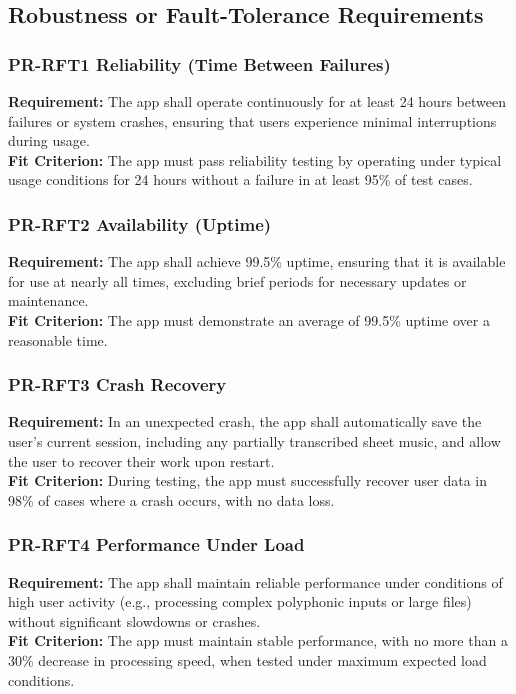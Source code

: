 \documentclass[12pt]{article}
\begin{document}
\subsection{Robustness or Fault-Tolerance Requirements}
\subsubsection*{PR-RFT1 Reliability (Time Between Failures)} \label{PR-RFT1}
\textbf{Requirement:} The app shall operate continuously for at least 24 hours between failures or system crashes, ensuring that users experience minimal interruptions during usage.\\
\textbf{Fit Criterion:} The app must pass reliability testing by operating under typical usage conditions for 24 hours without a failure in at least 95\% of test cases.
\subsubsection*{PR-RFT2 Availability (Uptime)} \label{PR-RFT2}
\textbf{Requirement:} The app shall achieve 99.5\% uptime, ensuring that it is available for use at nearly all times, excluding brief periods for necessary updates or maintenance.\\
\textbf{Fit Criterion:} The app must demonstrate an average of 99.5\% uptime over a reasonable time.
\subsubsection*{PR-RFT3 Crash Recovery} \label{PR-RFT3}
\textbf{Requirement:} In an unexpected crash, the app shall automatically save the user’s current session, including any partially transcribed sheet music, and allow the user to recover their work upon restart.\\
\textbf{Fit Criterion:} During testing, the app must successfully recover user data in 98\% of cases where a crash occurs, with no data loss.
\subsubsection*{PR-RFT4 Performance Under Load} \label{PR-RFT4}
\textbf{Requirement:} The app shall maintain reliable performance under conditions of high user activity (e.g., processing complex polyphonic inputs or large files) without significant slowdowns or crashes.\\
\textbf{Fit Criterion:} The app must maintain stable performance, with no more than a 30\% decrease in processing speed, when tested under maximum expected load conditions.
\end{document}
